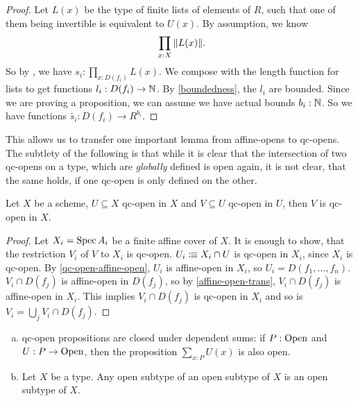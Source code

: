 \begin{proof}
  Let $L(x)$ be the type of finite lists of elements of $R$,
  such that one of them being invertible is equivalent to $U(x)$.
  By assumption, we know
  \[\prod_{x:X}\|L(x)\|\rlap{.}\]
  So by , we have $s_i:\prod_{x:D(f_i)}L(x)$.
  We compose with the length function for lists to get functions $l_i:D(f_i)\to\mathbb{N}$.
  By \cref{boundedness}, the $l_i$ are bounded.
  Since we are proving a proposition, we can assume we have actual bounds $b_i:\mathbb{N}$.
  So we have functions $\tilde{s_i}:D(f_i)\to R^{b_i}$.
\end{proof}

This allows us to transfer one important lemma from affine-opens to qc-opens.
The subtlety of the following is that while it is clear that the intersection of two
qc-opens on a type, which are \emph{globally} defined is open again, it is not clear,
that the same holds, if one qc-open is only defined on the other.

\begin{lemma}%
  \label{qc-open-trans}
  Let $X$ be a scheme, $U\subseteq X$ qc-open in $X$ and $V\subseteq U$ qc-open in $U$,
  then $V$ is qc-open in $X$.
\end{lemma}

\begin{proof}
  Let $X_i=\operatorname{Spec} A_i$ be a finite affine cover of $X$.
  It is enough to show, that the restriction $V_i$ of $V$ to $X_i$ is qc-open.
  $U_i\vcentcolon\mspace{-1.2mu}\equiv X_i\cap U$ is qc-open in $X_i$, since $X_i$ is qc-open.
  By \cref{qc-open-affine-open}, $U_i$ is affine-open in $X_i$,
  so $U_i=D(f_1,\dots,f_n)$.
  $V_i\cap D(f_j)$ is affine-open in $D(f_j)$, so by \cref{affine-open-trans},
  $V_i\cap D(f_j)$ is affine-open in $X_i$.
  This implies $V_i\cap D(f_j)$ is qc-open in $X_i$ and so is $V_i=\bigcup_{j}V_i\cap D(f_j)$.
\end{proof}

\begin{lemma}%
  \label{qc-open-sigma-closed}
  \begin{enumerate}[(a)]
  \item qc-open propositions are closed under dependent sums:
    if $P : \mathrm{Open}$ and $U : P \to \mathrm{Open}$,
    then the proposition $\sum_{x : P} U(x)$ is also open.
  \item Let $X$ be a type. Any open subtype of an open subtype of $X$ is an open subtype of $X$.
  \end{enumerate}
\end{lemma}

